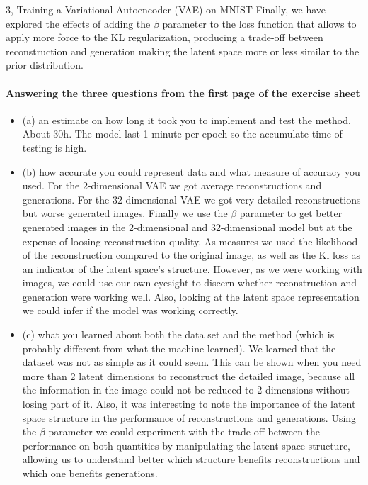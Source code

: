\begin{task}{3, Training a Variational Autoencoder (VAE) on MNIST}
Finally, we have explored the effects of adding the \(\beta\) parameter to the loss function that allows to apply more force to the KL regularization, producing a trade-off between reconstruction and generation making the latent space more or less similar to the prior distribution.


\paragraph{Answering the three questions from the first page of the exercise sheet}
\begin{itemize}
    \item (a) an estimate on how long it took you to implement and test the method. About 30h. The model last 1 minute per epoch so the accumulate time of testing is high.
    \item (b) how accurate you could represent data and what measure of accuracy you used. For the 2-dimensional VAE we got average reconstructions and generations. For the 32-dimensional VAE we got very detailed reconstructions but worse generated images. Finally we use the \(\beta\) parameter to get better generated images in the 2-dimensional and 32-dimensional model but at the expense of loosing reconstruction quality. As measures we used the likelihood of the reconstruction compared to the original image, as well as the Kl loss as an indicator of the latent space's structure. However, as we were working with images, we could use our own eyesight to discern whether reconstruction and generation were working well. Also, looking at the latent space representation we could infer if the model was working correctly.
    \item (c) what you learned about both the data set and the method (which is probably different from what the machine learned). We learned that the dataset was not as simple as it could seem. This can be shown when you need more than 2 latent dimensions to reconstruct the detailed image, because all the information in the image could not be reduced to 2 dimensions without losing part of it. Also, it was interesting to note the importance of the latent space structure in the performance of reconstructions and generations. Using the \(\beta\) parameter we could experiment with the trade-off between the performance on both quantities by manipulating the latent space structure, allowing us to understand better which structure benefits reconstructions and which one benefits generations.
\end{itemize}

\end{task}